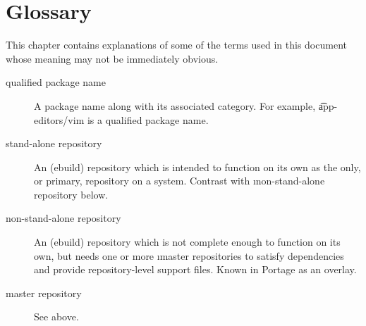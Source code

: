 \chapter{Glossary}
\label{ch:glossary}

This chapter contains explanations of some of the terms used in this document whose meaning may not
be immediately obvious.

\begin{description}
\item[qualified package name] A package name along with its associated category. For example,
    \t{app-editors/vim} is a qualified package name.
\item[stand-alone repository] An (ebuild) repository which is intended to function on its own as the
    only, or primary, repository on a system. Contrast with \i{non-stand-alone repository} below.
\item[non-stand-alone repository] An (ebuild) repository which is not complete enough to function
    on its own, but needs one or more \i{master repositories} to satisfy dependencies and provide
    repository-level support files. Known in Portage as an overlay.
\item[master repository] See above.

\end{description}


